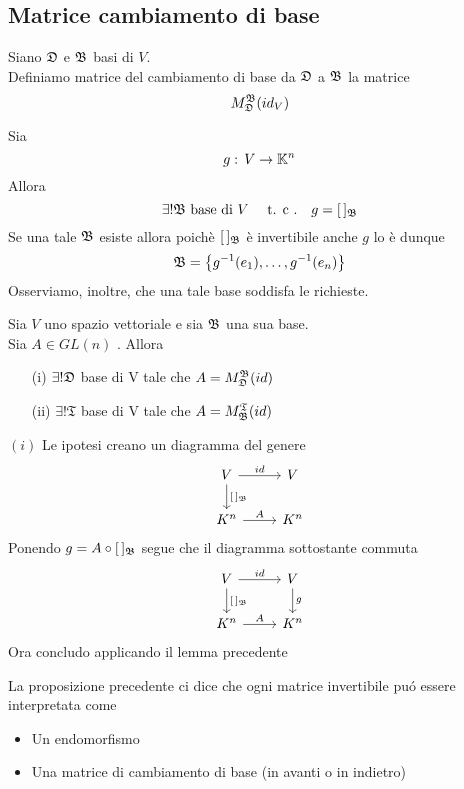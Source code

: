 \subsection{Matrice cambiamento di base}
\begin{defn} \bianco
Siano $\mathfrak{D}$ e $\mathfrak{B}$ basi di $V$.\\
Definiamo matrice del cambiamento di base da $\mathfrak{D}$ a $\mathfrak{B}$ la matrice 
$$ M_{\mathfrak{D}} ^{\mathfrak{B}} (id_V) $$
\end{defn}
\spazio
\begin{lem}Sia 
$$ g:\, V \to \mathbb{K}^n $$ 
Allora  $$\exists ! \mathfrak{B} \text{ base di } V \quad \text{ t. c .} \quad g = [\, ]_{\mathfrak{B}} $$
\proof
Se una tale $\mathfrak{B}$ esiste allora poich\`e $[\, ]_{\mathfrak{B}}$ \`e invertibile anche $g$ lo \`e dunque 
$$ \mathfrak{B} = \left\{ g^{-1}(e_1), \dots, g^{-1}(e_n) \right\}$$
Osserviamo, inoltre, che una tale base soddisfa le richieste.
\endproof
\end{lem}

\begin{prop} Sia $V $ uno spazio vettoriale  e sia $\mathfrak{B}$ una sua base.\\
Sia $A \in GL(n) $ . Allora
\begin{itemize}
\item[(i)] $ \exists ! \mathfrak{D} $ base di V tale che $ A = M_{\mathfrak{D}} ^{\mathfrak{B}} (id) $
\item[(ii)] $ \exists ! \mathfrak{T}$ base di V tale che $ A =M_{\mathfrak{B}}^ { \mathfrak{T}}(id)$

\end{itemize}
\proof $(i) $ Le ipotesi creano un diagramma del genere
$$\begin{tikzcd} 
V
\arrow[r,"id"]
\arrow{d}{[\,]_\B } 
&V
\\
K^n 
\arrow[r,"A"]
&K^n
\end{tikzcd}$$
Ponendo $g=A \circ [\, ]_{\mathfrak{B}} $ segue che il diagramma  sottostante commuta 
$$\begin{tikzcd} 
V
\arrow[r,"id"]
\arrow{d}{[\,]_\B}
&V
\arrow[d,"g"]\\
K^n 
\arrow[r,"A"]
&K^n
\end{tikzcd}$$
Ora concludo applicando il lemma precedente
\endproof
\begin{oss}La proposizione precedente ci dice che ogni matrice invertibile pu\'o essere interpretata come
\begin{itemize}
\item Un endomorfismo
\item Una matrice di cambiamento di base (in avanti o in indietro)
\end{itemize}
\end{oss}
\end{prop}
\newpage
